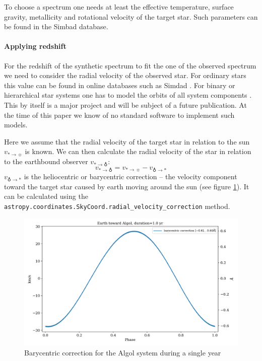 \documentclass[10pt,a4paper,notitlepage,twocolumn]{article}
\begin{document}
To choose a spectrum one needs at least the effective temperature, surface gravity, metallicity and rotational velocity of the target star.
Such parameters can be found in the Simbad \cite{Simbad} database.



\paragraph{Applying redshift}

For the redshift of the synthetic spectrum to fit the one of the observed spectrum we need to consider the radial velocity of the observed star.
For ordinary stars this value can be found in online databases such as Simdad \cite{Simbad}.
For binary or hierarchical star systems one has to model the orbits of all system components \cite{Gerlach2015}.
This by itself is a major project and will be subject of a future publication.
At the time of this paper we know of no standard software to implement such models.

Here we assume that the radial velocity of the target star in relation to the sun $v_{* \rightarrow \sun}$ is known.
We can then calculate the radial velocity of the star in relation to the earthbound observer $v_{* \rightarrow \earth}$:
\begin{equation}
	\label{eq:rv}
	v_{* \rightarrow \earth} = v_{* \rightarrow \sun} - v_{\earth \rightarrow *}
\end{equation}
$v_{\earth \rightarrow *}$ is the heliocentric or barycentric correction -- the velocity component toward the target star caused by earth moving around the sun (see figure \ref*{algol_bary}).
It can be calculated using the \texttt{astropy.\-coordinates.\-SkyCoord.\-radial\_\-velocity\_\-correction} method.

\begin{figure}[h]
	\includegraphics[width=\columnwidth]{img/algol_bary.png}
	\caption{Barycentric correction for the Algol system during a single year}
	\label{algol_bary}
\end{figure}
\end{document}
